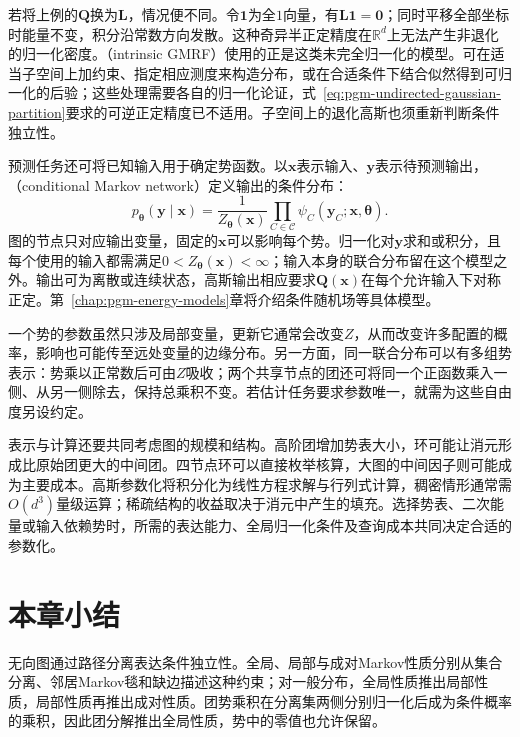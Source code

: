 若将上例的$\bm{Q}$换为$\bm{L}$，情况便不同。令$\bm{1}$为全$1$向量，有$\bm{L}\bm{1}=\bm{0}$；同时平移全部坐标时能量不变，积分沿常数方向发散。这种奇异半正定精度在$\mathbb{R}^d$上无法产生非退化的归一化密度。（intrinsic GMRF）使用的正是这类未完全归一化的模型。可在适当子空间上加约束、指定相应测度来构造分布，或在合适条件下结合似然得到可归一化的后验；这些处理需要各自的归一化论证，式~\eqref{eq:pgm-undirected-gaussian-partition}要求的可逆正定精度已不适用。子空间上的退化高斯也须重新判断条件独立性。

预测任务还可将已知输入用于确定势函数。以$\bm{x}$表示输入、$\bm{y}$表示待预测输出，（conditional Markov network）定义输出的条件分布：
\begin{equation}
  p_{\bm{\theta}}(\bm{y}\mid\bm{x})
  =\frac{1}{Z_{\bm{\theta}}(\bm{x})}
    \prod_{C\in\mathcal{C}}
    \psi_C(\bm{y}_C;\bm{x},\bm{\theta}).
  \label{eq:pgm-undirected-conditional-network}
\end{equation}
图的节点只对应输出变量，固定的$\bm{x}$可以影响每个势。归一化对$\bm{y}$求和或积分，且每个使用的输入都需满足$0<Z_{\bm{\theta}}(\bm{x})<\infty$；输入本身的联合分布留在这个模型之外。输出可为离散或连续状态，高斯输出相应要求$\bm{Q}(\bm{x})$在每个允许输入下对称正定。第~\ref{chap:pgm-energy-models}章将介绍条件随机场等具体模型。

一个势的参数虽然只涉及局部变量，更新它通常会改变$Z$，从而改变许多配置的概率，影响也可能传至远处变量的边缘分布。另一方面，同一联合分布可以有多组势表示：势乘以正常数后可由$Z$吸收；两个共享节点的团还可将同一个正函数乘入一侧、从另一侧除去，保持总乘积不变。若估计任务要求参数唯一，就需为这些自由度另设约定。

表示与计算还要共同考虑图的规模和结构。高阶团增加势表大小，环可能让消元形成比原始团更大的中间团。四节点环可以直接枚举核算，大图的中间因子则可能成为主要成本。高斯参数化将积分化为线性方程求解与行列式计算，稠密情形通常需$O(d^3)$量级运算；稀疏结构的收益取决于消元中产生的填充。选择势表、二次能量或输入依赖势时，所需的表达能力、全局归一化条件及查询成本共同决定合适的参数化。

\section{本章小结}
\label{sec:pgm-undirected-summary}

无向图通过路径分离表达条件独立性。全局、局部与成对Markov性质分别从集合分离、邻居Markov毯和缺边描述这种约束；对一般分布，全局性质推出局部性质，局部性质再推出成对性质。团势乘积在分离集两侧分别归一化后成为条件概率的乘积，因此团分解推出全局性质，势中的零值也允许保留。

